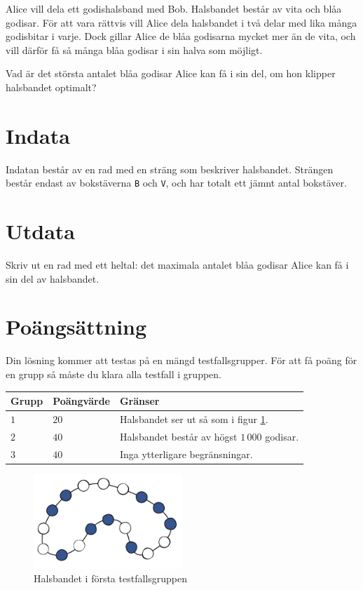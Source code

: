 Alice vill dela ett godishalsband med Bob.
Halsbandet består av vita och blåa godisar.
För att vara rättvis vill Alice dela halsbandet i två
delar med lika många godisbitar i varje.
Dock gillar Alice de blåa godisarna mycket mer än de vita,
och vill därför få så många blåa godisar i sin halva som möjligt.

Vad är det största antalet blåa godisar Alice kan få i sin del,
om hon klipper halsbandet optimalt?

\section*{Indata}
Indatan består av en rad med en sträng som beskriver halsbandet.
Strängen består endast av bokstäverna \texttt{B} och \texttt{V},
och har totalt ett jämnt antal bokstäver.

\section*{Utdata}
Skriv ut en rad med ett heltal: det maximala antalet blåa godisar Alice
kan få i sin del av halsbandet.

\section*{Poängsättning}
Din lösning kommer att testas på en mängd testfallsgrupper.
För att få poäng för en grupp så måste du klara alla testfall i gruppen.

\noindent
\begin{tabular}{| l | l | p{12cm} |}
  \hline
  Grupp & Poängvärde & Gränser \\ \hline
  $1$   & $20$       & Halsbandet ser ut så som i figur \ref{fig:group-1}. \\ \hline
  $2$   & $40$       & Halsbandet består av högst $1\,000$ godisar. \\ \hline
  $3$   & $40$       & Inga ytterligare begränsningar. \\ \hline
\end{tabular}


\begin{figure}[h]
	\centering
\includegraphics[width=0.5\textwidth]{group1}
\caption{Halsbandet i första testfallsgruppen}
\label{fig:group-1}
\end{figure}


